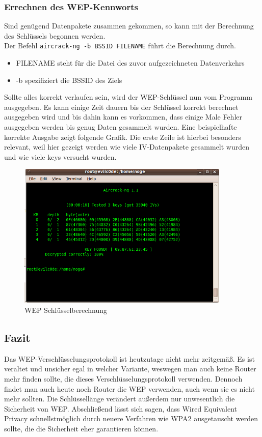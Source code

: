 	\subsubsection{Errechnen des WEP-Kennworts}
	Sind genügend Datenpakete zusammen gekommen, so kann mit der Berechnung des Schlüssels begonnen werden. \\Der Befehl \colorbox{altgray}{\lstinline|aircrack-ng -b BSSID FILENAME|} führt die Berechnung durch.
				\begin{itemize}
					\item FILENAME steht für die Datei des zuvor aufgezeichneten Datenverkehrs
					\item -b spezifiziert die BSSID des Ziels
				\end{itemize}

	 Sollte alles korrekt verlaufen sein, wird der WEP-Schlüssel nun vom Programm ausgegeben. Es kann einige Zeit dauern bis der Schlüssel korrekt berechnet ausgegeben wird und bis dahin kann es vorkommen, dass einige Male Fehler ausgegeben werden bis genug Daten gesammelt wurden. Eine beispielhafte korrekte Ausgabe zeigt folgende Grafik. Die erste Zeile ist hierbei besonders relevant, weil hier gezeigt werden wie viele IV-Datenpakete gesammelt wurden und wie viele keys versucht wurden.

	 		\begin{figure}[H]
	 			\centering
	 			\includegraphics[width=0.9\textwidth]{images/WLAN/wepkey.png}
	 			\caption{WEP Schlüsselberechnung}
	 			\label{fig:WEP Schlüsselberechnung}
	 		\end{figure}

\subsection{Fazit}
Das WEP-Verschlüsselungsprotokoll ist heutzutage nicht mehr zeitgemäß. Es ist veraltet und unsicher egal in welcher Variante, weswegen man auch keine Router mehr finden sollte, die dieses Verschlüsselungsprotokoll verwenden. Dennoch findet man auch heute noch Router die WEP verwenden, auch wenn sie es nicht mehr sollten. Die Schlüssellänge verändert außerdem nur unwesentlich die Sicherheit von WEP. Abschließend lässt sich sagen, dass Wired Equivalent Privacy schnellstmöglich durch neuere Verfahren wie WPA2 ausgetauscht werden sollte, die die Sicherheit eher garantieren können.
\newpage

